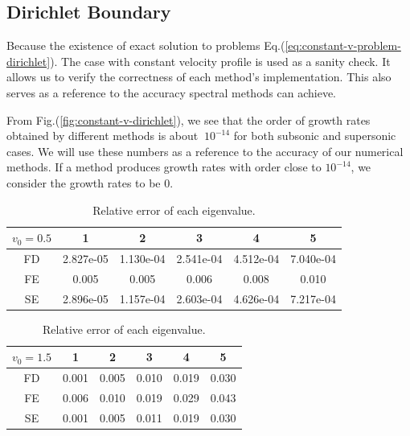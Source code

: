 \subsection{Dirichlet Boundary}
Because the existence of exact solution to problems Eq.(\ref{eq:constant-v-problem-dirichlet}). The case with constant velocity profile is used as a sanity check. It allows us to verify the correctness of each method's implementation. This also serves as a reference to the accuracy spectral methods can achieve.

From Fig.(\ref{fig:constant-v-dirichlet}), we see that the order of growth rates obtained by different methods is about $~10^{-14}$ for both subsonic and supersonic cases. We will use these numbers as a reference to the accuracy of our numerical methods. If a method produces growth rates with order close to $10^{-14}$, we consider the growth rates to be 0.

\begin{table} [H]
	\centering
	\caption{Relative error of each eigenvalue.}
	\begin{tabular}{|c|c|c|c|c|c|}
		\hline
		$v_0=0.5$ & 1         & 2         & 3         & 4         & 5         \\
		\hline
		FD        & 2.827e-05 & 1.130e-04 & 2.541e-04 & 4.512e-04 & 7.040e-04 \\
		\hline
		FE        & 0.005     & 0.005     & 0.006     & 0.008     & 0.010     \\
		\hline
		SE        & 2.896e-05 & 1.157e-04 & 2.603e-04 & 4.626e-04 & 7.217e-04 \\
		\hline
	\end{tabular}
	\begin{tabular}{|c|c|c|c|c|c|}
		\hline
		$v_0=1.5$ & 1     & 2     & 3     & 4     & 5     \\
		\hline
		FD        & 0.001 & 0.005 & 0.010 & 0.019 & 0.030 \\
		\hline
		FE        & 0.006 & 0.010 & 0.019 & 0.029 & 0.043 \\
		\hline
		SE        & 0.001 & 0.005 & 0.011 & 0.019 & 0.030 \\
		\hline
	\end{tabular}
	\label{table:eigenvalue-error-dirichlet}
\end{table}

